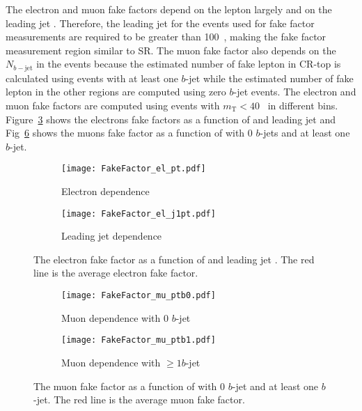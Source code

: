 The electron and muon fake factors depend on the lepton \pt largely and on the leading jet \pt.
Therefore, the leading jet \pt for the events used for fake factor measurements are required to be greater than 100~{\GeV}, making the fake factor measurement region similar to SR.
The muon fake factor also depends on the $N_{b-\mathrm{jet}}$ in the events because the estimated number of fake lepton in CR-top is calculated using events with at least one $b$-jet while the estimated number of fake lepton in the other regions are computed using zero $b$-jet events.
The electron and muon fake factors are computed using events with $m_\mathrm{T} < 40$~{\GeV} in different \pt bins.
Figure~\ref{fig:bkg_electron_fake_factor} shows the electrons fake factors as a function of \pt and leading jet \pt and Fig~\ref{fig:bkg_muon_fake_factor} shows the muons fake factor as a function of \pt with 0 $b$-jets and at least one $b$-jet.

\begin{figure}[htbp]
    \begin{center}
        \begin{subfigure}[b]{0.48\textwidth}
            \texttt{[image: FakeFactor\_el\_pt.pdf]}
            \caption{Electron \pt dependence}
            \label{fig:bkg_electron_fake_factor_pt}
        \end{subfigure}
        \begin{subfigure}[b]{0.48\textwidth}
            \texttt{[image: FakeFactor\_el\_j1pt.pdf]}
            \caption{Leading jet \pt dependence}
            \label{fig:bkg_electron_fake_factor_leading_jet_pt}
        \end{subfigure}
        \caption{The electron fake factor as a function of \pt and leading jet \pt.
        The red line is the average electron fake factor.}
        \label{fig:bkg_electron_fake_factor}
    \end{center}
\end{figure}

\begin{figure}[htbp]
    \begin{center}
        \begin{subfigure}[b]{0.48\textwidth}
            \texttt{[image: FakeFactor\_mu\_ptb0.pdf]}
            \caption{Muon \pt dependence with 0 $b$-jet}
            \label{fig:bkg_muon_fake_factor_pt_0bjet}
        \end{subfigure}
        \begin{subfigure}[b]{0.48\textwidth}
            \texttt{[image: FakeFactor\_mu\_ptb1.pdf]}
            \caption{Muon \pt dependence with $\ge 1 b$-jet}
            \label{fig:bkg_muon_fake_factor_pt_bjets}
        \end{subfigure}
        \caption{The muon fake factor as a function of \pt with 0 $b$-jet and at least one $b$-jet.
        The red line is the average muon fake factor.}
        \label{fig:bkg_muon_fake_factor}
    \end{center}
\end{figure}

